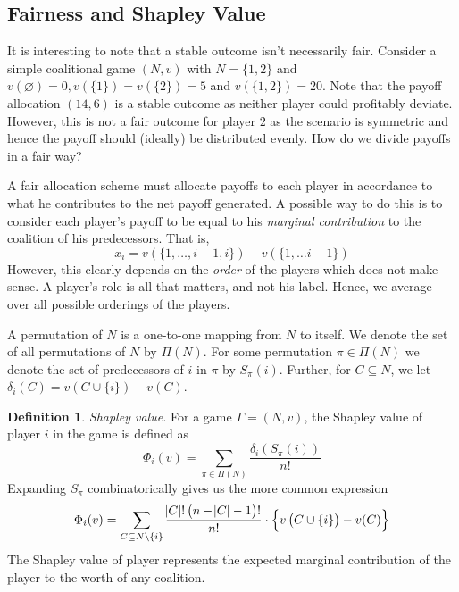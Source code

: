 \documentclass{article}
\theoremstyle{definition}
\newtheorem{defn}[theorem]{Definition}
\newcommand\ddfrac[2]{\frac{\displaystyle #1}{\displaystyle #2}}
\begin{document}
\subsection{Fairness and Shapley Value}

It is interesting to note that a stable outcome isn't necessarily fair. Consider a simple coalitional game $(N,v)$ with $N = \{1,2\}$ and $v(\varnothing) = 0, v\left( \{1\}\right) = v\left( \{2\} \right) = 5$ and $v\left( \{1,2\} \right) = 20$. Note that the payoff allocation $(14,6)$ is a stable outcome as neither player could profitably deviate. However, this is not a fair outcome for player $2$ as the scenario is symmetric and hence the payoff should (ideally) be distributed evenly. How do we divide payoffs in a fair way?

A fair allocation scheme must allocate payoffs to each player in accordance to what he contributes to the net payoff generated. A possible way to do this is to consider each player's payoff to be equal to his \textit{marginal contribution} to the coalition of his predecessors. That is,
\[
    x_i = v\left( \{ 1, \ldots , i-1, i \} \right) - v\left( \{ 1, \ldots i-1 \} \right)
\]
However, this clearly depends on the \textit{order} of the players which does not make sense. A player's role is all that matters, and not his label. Hence, we average over all possible orderings of the players. \medskip

A permutation of $N$ is a one-to-one mapping from $N$ to itself. We denote the set of all permutations of $N$ by $\Pi(N)$. For some permutation $\pi \in \Pi(N)$ we denote the set of predecessors of $i$ in $\pi$ by $S_{\pi}(i)$. Further, for $C \subseteq N$, we let $\delta_i(C) = v\left( C \cup \{i\} \right) - v(C)$. 
\begin{defn}
\textit{Shapley value.} For a game $\Gamma = (N,v)$, the Shapley value of player $i$ in the game is defined as 
\[
    \Phi_i(v) = \sum\limits_{\pi \in \Pi(N)} \frac{\delta_i\left( S_{\pi}(i) \right)}{n!}
\]  
Expanding $S_{\pi}$ combinatorically gives us the more common expression
\[
    \Phi_i(v) = \sum\limits_{C \subseteq N \setminus \{i\}} \ddfrac{\abs{C}! \left( n - \abs{C} - 1 \right)!}{n!} \cdot \left\{ v\left( C \cup \{i\} \right) - v(C) \right\}
\]  
The Shapley value of player represents the expected marginal contribution of the player to the worth of any coalition.
\end{defn}
\end{document}
